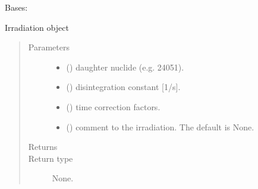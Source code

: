 \documentclass[letterpaper,10pt,english]{sphinxmanual}
\begin{document}
\begin{fulllineitems}
\label{\detokenize{api/inputgeneration:parsersD1S.Irradiation}}
\sphinxAtStartPar
Bases: 

\sphinxAtStartPar
Irradiation object
\begin{quote}\begin{description}
\item[{Parameters}] \leavevmode\begin{itemize}
\item {} 
\sphinxAtStartPar
{} () \textendash{} daughter nuclide (e.g. 24051).

\item {} 
\sphinxAtStartPar
{} () \textendash{} disintegration constant {[}1/s{]}.

\item {} 
\sphinxAtStartPar
{} () \textendash{} time correction factors.

\item {} 
\sphinxAtStartPar
{} (\sphinxstyleliteralemphasis{\sphinxupquote{, }}) \textendash{} comment to the irradiation. The default is None.

\end{itemize}

\item[{Returns}] \leavevmode
\sphinxAtStartPar


\item[{Return type}] \leavevmode
\sphinxAtStartPar
None.

\end{description}\end{quote}


\end{fulllineitems}
\end{document}
